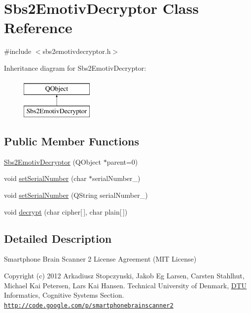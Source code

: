 \hypertarget{classSbs2EmotivDecryptor}{\section{Sbs2\-Emotiv\-Decryptor Class Reference}
\label{classSbs2EmotivDecryptor}
}


{\ttfamily \#include $<$sbs2emotivdecryptor.\-h$>$}

Inheritance diagram for Sbs2\-Emotiv\-Decryptor\-:\begin{figure}[H]
\begin{center}
\leavevmode
\includegraphics[height=2.000000cm]{classSbs2EmotivDecryptor}
\end{center}
\end{figure}
\subsection*{Public Member Functions}
\begin{DoxyCompactItemize}
\item 
\hyperlink{classSbs2EmotivDecryptor_a2c6aa5b39e471d5eeec155d4a0b0c1e5}{Sbs2\-Emotiv\-Decryptor} (Q\-Object $\ast$parent=0)
\item 
void \hyperlink{classSbs2EmotivDecryptor_a589f85bd37e15e6359b03cfb5d33dceb}{set\-Serial\-Number} (char $\ast$serial\-Number\-\_\-)
\item 
void \hyperlink{classSbs2EmotivDecryptor_af6846ef65ed5168abf367dfa6ef266da}{set\-Serial\-Number} (Q\-String serial\-Number\-\_\-)
\item 
void \hyperlink{classSbs2EmotivDecryptor_ad6dbde08a191bee980f0ebac1658738d}{decrypt} (char cipher\mbox{[}$\,$\mbox{]}, char plain\mbox{[}$\,$\mbox{]})
\end{DoxyCompactItemize}


\subsection{Detailed Description}
Smartphone Brain Scanner 2 License Agreement (M\-I\-T License)

Copyright (c) 2012 Arkadiusz Stopczynski, Jakob Eg Larsen, Carsten Stahlhut, Michael Kai Petersen, Lars Kai Hansen. Technical University of Denmark, \hyperlink{namespaceDTU}{D\-T\-U} Informatics, Cognitive Systems Section. \href{http://code.google.com/p/smartphonebrainscanner2}{\tt http\-://code.\-google.\-com/p/smartphonebrainscanner2}

